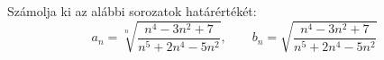 \documentclass[11pt]{scrartcl}
\begin{document}
Számolja ki az alábbi sorozatok határértékét:
\[
	a_n = \sqrt[n]{\frac{n^4 - 3n^2 + 7}{n^5 + 2n^4 - 5n^2}}, \qquad
	b_n = \sqrt{\frac{n^4 - 3n^2 + 7}{n^5 + 2n^4 - 5n^2}}
\]
\end{document}
